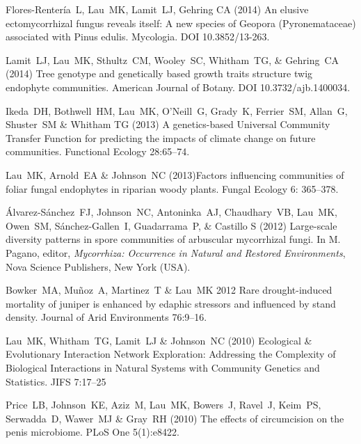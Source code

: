 \documentclass[letterpaper]{article}
\renewenvironment{itemize}{
  \begin{list}{}{
    \setlength{\leftmargin}{1em}
  }
}{
  \end{list}
}
\begin{document}
\begin{itemize}
\item Flores-Renter\'{i}a\ L, Lau\ MK, Lamit\ LJ, Gehring CA
  (2014) An elusive ectomycorrhizal fungus reveals
  itself: A new species of Geopora (Pyronemataceae) associated with
  Pinus edulis. Mycologia. DOI 10.3852/13-263.

\item Lamit\ LJ, Lau\ MK, Sthultz\ CM, Wooley\ SC, Whitham\ TG, \&
  Gehring\ CA (2014) Tree genotype and genetically based growth traits
  structure twig endophyte communities. American Journal of
  Botany. DOI 10.3732/ajb.1400034.

\item Ikeda\ DH, Bothwell\ HM, Lau\ MK, O'Neill\ G, Grady\ K,
  Ferrier\ SM, Allan\ G, Shuster\ SM \& Whitham TG
  (2013) A genetics-based Universal Community Transfer Function for
  predicting the impacts of climate change on future communities. Functional
  Ecology 28:65--74.

\item Lau\ MK, Arnold\ EA \& Johnson\ NC (2013)Factors influencing
  communities of foliar fungal endophytes in riparian woody
  plants. Fungal Ecology 6: 365--378.

\item \'{A}lvarez-S\'{a}nchez\ FJ, Johnson\ NC, Antoninka\ AJ,
  Chaudhary\ VB, Lau\ MK, Owen\ SM, S\'{a}nchez-Gallen\ I,
  Guadarrama\ P, \& Castillo S (2012) Large-scale diversity patterns in
  spore communities of arbuscular mycorrhizal fungi. In M. Pagano,
  editor, \textit{Mycorrhiza: Occurrence in Natural and Restored
    Environments}, Nova Science Publishers, New York (USA).

\item Bowker\ MA, Mu\~noz\ A, Martinez\ T \& Lau\ MK 2012 Rare
  drought-induced mortality of juniper is enhanced by edaphic
  stressors and influenced by stand density. Journal of Arid
  Environments 76:9--16.

\item Lau\ MK, Whitham\ TG, Lamit\ LJ \& Johnson\ NC (2010) Ecological
  \& Evolutionary Interaction Network Exploration: Addressing the
  Complexity of Biological Interactions in Natural Systems with
  Community Genetics and Statistics. JIFS 7:17--25 

\item Price\ LB, Johnson\ KE, Aziz\ M, Lau\ MK, Bowers\ J, Ravel\ J,
  Keim\ PS, Serwadda\ D, Wawer\ MJ \& Gray\ RH (2010) The effects
  of circumcision on the penis microbiome. PLoS One 5(1):e8422. 


\end{itemize}
\end{document}

